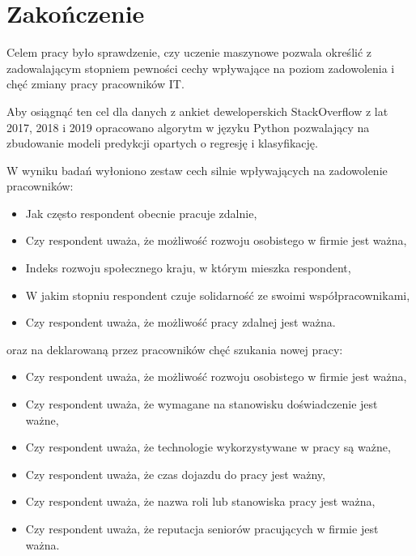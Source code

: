 \chapter*{Zakończenie}\label{ch:ending}

Celem pracy było sprawdzenie, czy uczenie maszynowe pozwala określić z zadowalającym stopniem
pewności cechy wpływające na poziom zadowolenia i chęć zmiany pracy pracowników IT.

Aby osiągnąć ten cel dla danych z ankiet deweloperskich StackOverflow \cite{so-survey-info} z lat 2017, 2018 i 2019
opracowano algorytm w języku Python pozwalający na zbudowanie modeli predykcji opartych o regresję i klasyfikację.

W wyniku badań wyłoniono zestaw cech silnie wpływających na zadowolenie pracowników:

\begin{itemize}
    \item Jak często respondent obecnie pracuje zdalnie,
    \item Czy respondent uważa, że możliwość rozwoju osobistego w firmie jest ważna,
    \item Indeks rozwoju społecznego kraju, w którym mieszka respondent,
    \item W jakim stopniu respondent czuje solidarność ze swoimi współpracownikami,
    \item Czy respondent uważa, że możliwość pracy zdalnej jest ważna.
\end{itemize}

oraz na deklarowaną przez pracowników chęć szukania nowej pracy:

\begin{itemize}
    \item Czy respondent uważa, że możliwość rozwoju osobistego w firmie jest ważna,
    \item Czy respondent uważa, że wymagane na stanowisku doświadczenie jest ważne,
    \item Czy respondent uważa, że technologie wykorzystywane w pracy są ważne,
    \item Czy respondent uważa, że czas dojazdu do pracy jest ważny,
    \item Czy respondent uważa, że nazwa roli lub stanowiska pracy jest ważna,
    \item Czy respondent uważa, że reputacja seniorów pracujących w firmie jest ważna.
\end{itemize}

